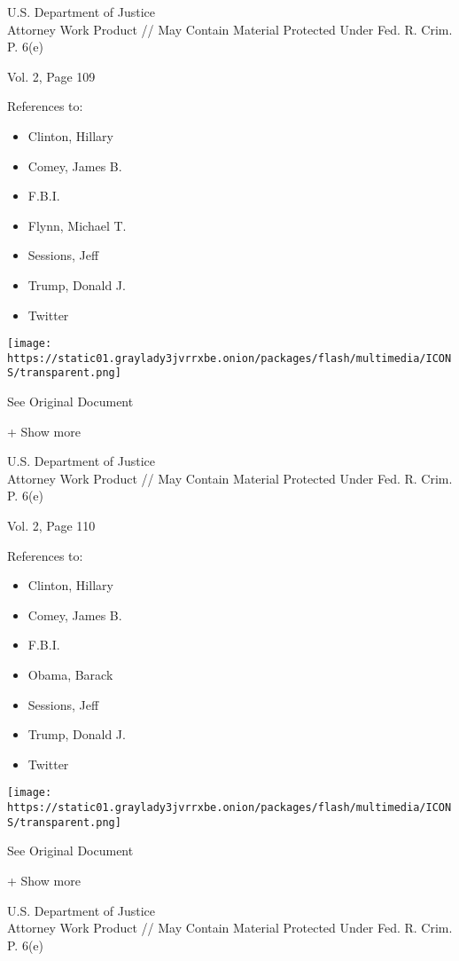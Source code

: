 U.S. Department of Justice\\
Attorney Work Product // May Contain Material Protected Under Fed. R.
Crim. P. 6(e)

Vol. 2, Page 109

References to:

\begin{itemize}
\tightlist
\item
  Clinton, Hillary
\item
  Comey, James B.
\item
  F.B.I.
\item
  Flynn, Michael T.
\item
  Sessions, Jeff
\item
  Trump, Donald J.
\item
  Twitter
\end{itemize}

\protect\hyperlink{}{}

\texttt{[image: https://static01.graylady3jvrrxbe.onion/packages/flash/multimedia/ICONS/transparent.png]}

See Original Document

+ Show more

U.S. Department of Justice\\
Attorney Work Product // May Contain Material Protected Under Fed. R.
Crim. P. 6(e)

Vol. 2, Page 110

References to:

\begin{itemize}
\tightlist
\item
  Clinton, Hillary
\item
  Comey, James B.
\item
  F.B.I.
\item
  Obama, Barack
\item
  Sessions, Jeff
\item
  Trump, Donald J.
\item
  Twitter
\end{itemize}

\protect\hyperlink{}{}

\texttt{[image: https://static01.graylady3jvrrxbe.onion/packages/flash/multimedia/ICONS/transparent.png]}

See Original Document

+ Show more

U.S. Department of Justice\\
Attorney Work Product // May Contain Material Protected Under Fed. R.
Crim. P. 6(e)

